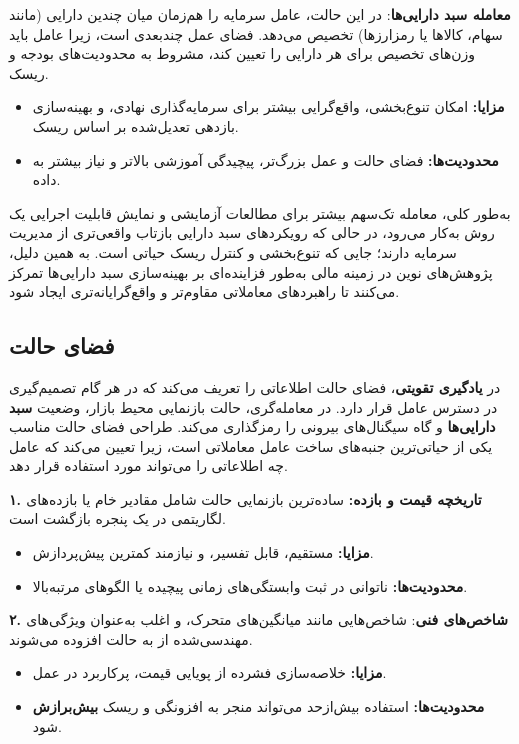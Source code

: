 \documentclass[12pt, a4paper]{report}
\begin{document}
\bigskip
\textbf{معامله سبد دارایی‌ها}:  
در این حالت، عامل سرمایه را هم‌زمان میان چندین دارایی (مانند سهام، کالاها یا رمزارزها) تخصیص می‌دهد. فضای عمل چندبعدی است، زیرا عامل باید وزن‌های تخصیص برای هر دارایی را تعیین کند، مشروط به محدودیت‌های بودجه و ریسک.  
\begin{itemize}
    \item \textbf{مزایا:} امکان تنوع‌بخشی، واقع‌گرایی بیشتر برای سرمایه‌گذاری نهادی، و بهینه‌سازی بازدهی تعدیل‌شده بر اساس ریسک.  
    \item \textbf{محدودیت‌ها:} فضای حالت و عمل بزرگ‌تر، پیچیدگی آموزشی بالاتر و نیاز بیشتر به داده.  
\end{itemize}

\bigskip

به‌طور کلی، معامله تک‌سهم بیشتر برای مطالعات آزمایشی و نمایش قابلیت اجرایی یک روش به‌کار می‌رود، در حالی که رویکردهای سبد دارایی بازتاب واقعی‌تری از مدیریت سرمایه دارند؛ جایی که تنوع‌بخشی و کنترل ریسک حیاتی است. به همین دلیل، پژوهش‌های نوین در زمینه مالی به‌طور فزاینده‌ای بر بهینه‌سازی سبد دارایی‌ها تمرکز می‌کنند تا راهبردهای معاملاتی مقاوم‌تر و واقع‌گرایانه‌تری ایجاد شود.

\subsection{فضای حالت\protect\footnotemark}\label{subsec:state-space}

در \textbf{یادگیری تقویتی}، فضای حالت اطلاعاتی را تعریف می‌کند که در هر گام تصمیم‌گیری در دسترس عامل قرار دارد. در معامله‌گری، حالت بازنمایی محیط بازار، وضعیت \textbf{سبد دارایی‌ها} و گاه سیگنال‌های بیرونی را رمزگذاری می‌کند. طراحی فضای حالت مناسب یکی از حیاتی‌ترین جنبه‌های ساخت عامل معاملاتی است، زیرا تعیین می‌کند که عامل چه اطلاعاتی را می‌تواند مورد استفاده قرار دهد.  

\bigskip
\textbf{۱. تاریخچه قیمت و بازده:}  
ساده‌ترین بازنمایی حالت شامل مقادیر خام  یا بازده‌های لگاریتمی در یک پنجره بازگشت است.  
\begin{itemize}
    \item \textbf{مزایا:} مستقیم، قابل تفسیر، و نیازمند کمترین پیش‌پردازش.  
    \item \textbf{محدودیت‌ها:} ناتوانی در ثبت وابستگی‌های زمانی پیچیده یا الگوهای مرتبه‌بالا.  
\end{itemize}

\bigskip
\textbf{۲. شاخص‌های فنی}:  
شاخص‌هایی مانند میانگین‌های متحرک،  و  اغلب به‌عنوان ویژگی‌های مهندسی‌شده از  به حالت افزوده می‌شوند.  
\begin{itemize}
    \item \textbf{مزایا:} خلاصه‌سازی فشرده از پویایی قیمت، پرکاربرد در عمل.  
    \item \textbf{محدودیت‌ها:} استفاده بیش‌ازحد می‌تواند منجر به افزونگی و ریسک \textbf{بیش‌برازش} شود.  
\end{itemize}
\end{document}

